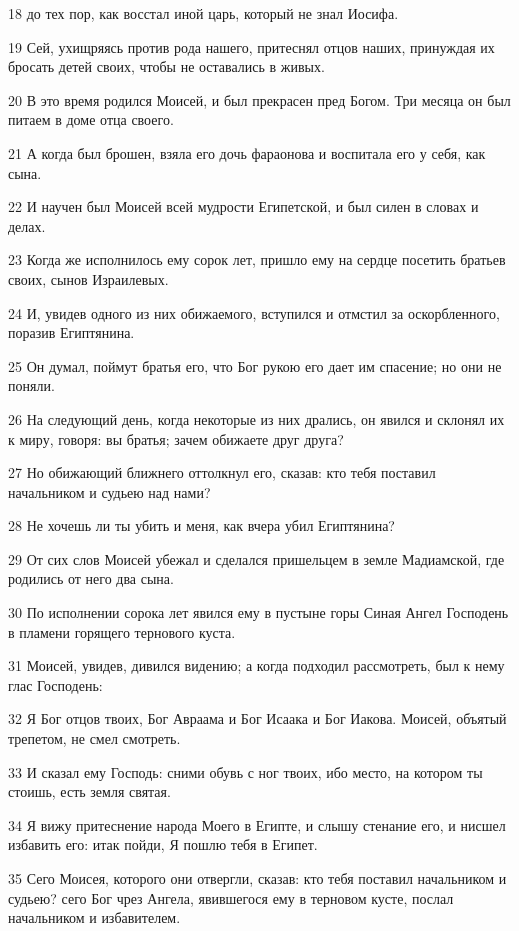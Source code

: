 \par 18 до тех пор, как восстал иной царь, который не знал Иосифа.
\par 19 Сей, ухищряясь против рода нашего, притеснял отцов наших, принуждая их бросать детей своих, чтобы не оставались в живых.
\par 20 В это время родился Моисей, и был прекрасен пред Богом. Три месяца он был питаем в доме отца своего.
\par 21 А когда был брошен, взяла его дочь фараонова и воспитала его у себя, как сына.
\par 22 И научен был Моисей всей мудрости Египетской, и был силен в словах и делах.
\par 23 Когда же исполнилось ему сорок лет, пришло ему на сердце посетить братьев своих, сынов Израилевых.
\par 24 И, увидев одного из них обижаемого, вступился и отмстил за оскорбленного, поразив Египтянина.
\par 25 Он думал, поймут братья его, что Бог рукою его дает им спасение; но они не поняли.
\par 26 На следующий день, когда некоторые из них дрались, он явился и склонял их к миру, говоря: вы братья; зачем обижаете друг друга?
\par 27 Но обижающий ближнего оттолкнул его, сказав: кто тебя поставил начальником и судьею над нами?
\par 28 Не хочешь ли ты убить и меня, как вчера убил Египтянина?
\par 29 От сих слов Моисей убежал и сделался пришельцем в земле Мадиамской, где родились от него два сына.
\par 30 По исполнении сорока лет явился ему в пустыне горы Синая Ангел Господень в пламени горящего тернового куста.
\par 31 Моисей, увидев, дивился видению; а когда подходил рассмотреть, был к нему глас Господень:
\par 32 Я Бог отцов твоих, Бог Авраама и Бог Исаака и Бог Иакова. Моисей, объятый трепетом, не смел смотреть.
\par 33 И сказал ему Господь: сними обувь с ног твоих, ибо место, на котором ты стоишь, есть земля святая.
\par 34 Я вижу притеснение народа Моего в Египте, и слышу стенание его, и нисшел избавить его: итак пойди, Я пошлю тебя в Египет.
\par 35 Сего Моисея, которого они отвергли, сказав: кто тебя поставил начальником и судьею? сего Бог чрез Ангела, явившегося ему в терновом кусте, послал начальником и избавителем.
